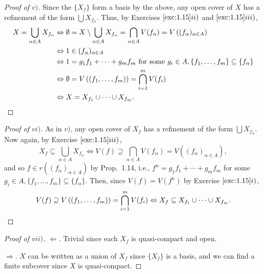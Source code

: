 \documentclass[12pt,letterpaper]{article}
\theoremstyle{definition}
\theoremstyle{remark}
\numberwithin{figure}{problem}
\numberwithin{equation}{section}
\begin{document}
\begin{proof}[Proof of
  $v)$]
  Since the
  $\{X_f\}$ form a basis by the above, any open cover of
  $X$ has a refinement of the form
  $\bigcup
  X_{f_\alpha}$.
  Thus, by Exercises
  $\ref{exc:1.15}ii)$ and
  $\ref{exc:1.15}iii)$,
  \begin{align*}
    X = \bigcup_{\alpha \in A} X_{f_\alpha} &%
    \Leftrightarrow \emptyset = X \setminus \bigcup_{\alpha \in A} X_{f_\alpha} = \bigcap_{\alpha \in A} V(f_\alpha) = V\left( (f_\alpha)_{\alpha\in A} \right)\\
    &%
    \Leftrightarrow 1 \in (f_\alpha)_{\alpha \in A}\\
    &%
    \Leftrightarrow 1 = g_1f_1 + \cdots + g_mf_m\ \text{for some}\ g_i \in A, \{f_1,\ldots,f_m\} \subseteq \{f_\alpha\}\\
    &%
    \Leftrightarrow \emptyset = V\left( (f_1,\ldots,f_{m}) \right) = \bigcap_{i=1}^m V(f_i)\\
    &%
    \Leftrightarrow X = X_{f_1} \cup \cdots \cup X_{f_m}.\qedhere
  \end{align*}
\end{proof}
\begin{proof}[Proof of
  $vi)$]
  As in
  $v)$, any open cover of
  $X_f$ has a refinement of the form
  $\bigcup
  X_{f_\alpha}$.
  Now again, by Exercise
  $\ref{exc:1.15}iii)$,
  \begin{equation*}
    X_f \subseteq \bigcup_{\alpha \in A} X_{f_\alpha} \Leftrightarrow V(f) \supseteq \bigcap_{\alpha \in A} V(f_\alpha) = V\left( (f_\alpha)_{\alpha \in A} \right),
  \end{equation*}
  and so
  $f \in r\left( (f_\alpha)_{\alpha \in A}
  \right)$ by Prop.~1.14, i.e.,
  $f^n = g_1f_1 + \cdots +
  g_mf_m$ for some
  $g_i \in A, \{f_1,\ldots,f_m\} \subseteq
  \{f_\alpha\}$.
  Then, since
  $V(f) =
  V(f^n)$ by Exercise
  $\ref{exc:1.15}i)$,
  \begin{equation*}
    V(f) \supseteq V\left( (f_1,\ldots,f_m) \right) = \bigcap_{i=1}^m V(f_i) \Leftrightarrow X_f \subseteq X_{f_1} \cup \cdots \cup X_{f_m}.\qedhere
  \end{equation*}
\end{proof}
\begin{proof}[Proof of
  $vii)$]
  $\Leftarrow$.
  Trivial since each
  $X_f$ is quasi-compact and open.
  \par
  $\Rightarrow$.
  $X$ can be written as a union of
  $X_f$ since
  $\{X_f\}$ is a basis, and we can find a finite subcover since
  $X$ is quasi-compact.
\end{proof}
\end{document}
